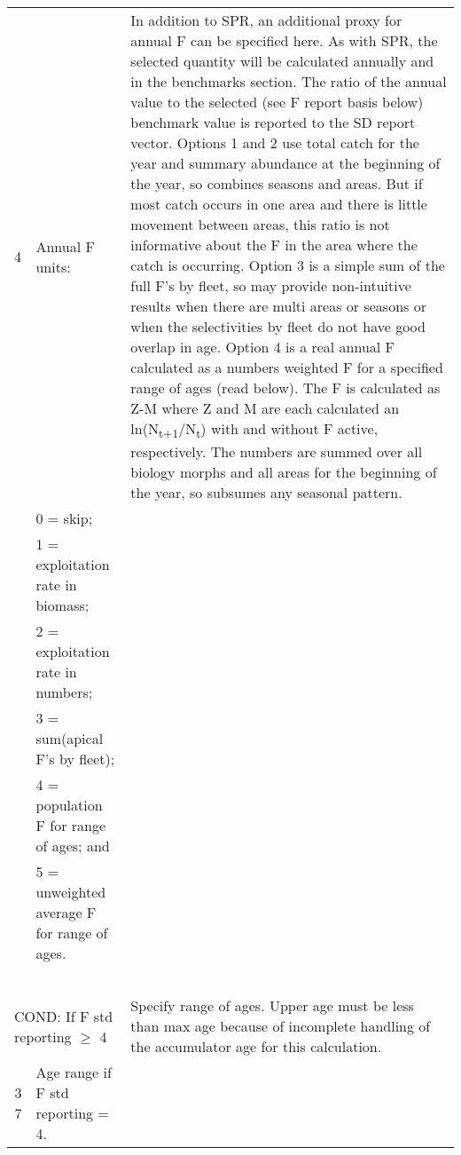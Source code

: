 {\begin{landscape}
\begin{longtable}{p{1.5cm} p{7.2cm} p{12.3cm}}
 \pagebreak
 4 & Annual F units: & \multirow{1}{1cm}[-0.25cm]{\parbox{12.5cm}{In addition to SPR, an additional proxy for annual F can be specified here. As with SPR, the selected quantity will be calculated annually and in the benchmarks section. The ratio of the annual value to the selected (see F report basis below) benchmark value is reported to the SD report vector. Options 1 and 2 use total catch for the year and summary abundance at the beginning of the year, so combines seasons and areas. But if most catch occurs in one area and there is little movement between areas, this ratio is not informative about the F in the area where the catch is occurring. Option 3 is a simple sum of the full F's by fleet, so may provide non-intuitive results when there are multi areas or seasons or when the selectivities by fleet do not have good overlap in age. Option 4 is a real annual F calculated as a numbers weighted F for a specified range of ages (read below). The F is calculated as Z-M where Z and M are each calculated an ln(N\textsubscript{t+1}/N\textsubscript{t}) with and without F active, respectively. The numbers are summed over all biology morphs and all areas for the beginning of the year, so subsumes any seasonal pattern.}} \Tstrut\Bstrut\\
   & 0 = skip; & \\
   & 1 = exploitation rate in biomass; & \\
   & 2 = exploitation rate in numbers; & \\
   & 3 = sum(apical F's by fleet); & \\
   & 4 = population F for range of ages; and & \\
   & 5 = unweighted average F for range of ages. & \\
   & & \\
   & & \\
   & & \\
   & & \\
   & & \Bstrut\\ 
  
 \hline
 \multicolumn{2}{l}{COND: If F std reporting $\geq$ 4} & \multirow{1}{1cm}[-0.25cm]{\parbox{12.5cm}{Specify range of ages. Upper age must be less than max age because of incomplete handling of the accumulator age for this calculation.}} \Tstrut\\
 \multicolumn{1}{r}{3 7}  & Age range if F std reporting = 4. & \Tstrut\Bstrut\\


\end{longtable}
\end{landscape}}
